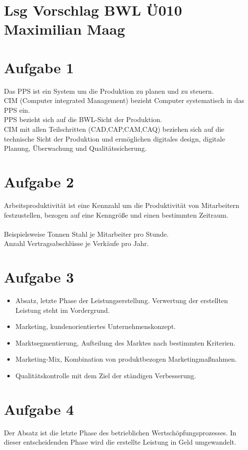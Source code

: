 \documentclass{article}
\begin{document}
	\section*{Lsg Vorschlag BWL Ü010 Maximilian Maag}
	\section*{Aufgabe 1}
	Das PPS ist ein System um die Produktion zu planen und zu steuern. \\
	CIM (Computer integrated Management) bezieht Computer systematisch in das PPS ein. \\
	PPS bezieht sich auf die BWL-Sicht der Produktion. \\
	CIM mit allen Teilschritten (CAD,CAP,CAM,CAQ) beziehen sich auf die technische Sicht der Produktion und ermöglichen digitales design, digitale Planung, Überwachung und Qualitätssicherung.
	\section*{Aufgabe 2}
	Arbeitsproduktivität ist eine Kennzahl um die Produktivität von Mitarbeitern festzustellen, bezogen auf eine Kenngröße und einen bestimmten Zeitraum. \\ \\
	Beispielsweise Tonnen Stahl je Mitarbeiter pro Stunde. \\
	Anzahl Vertragsabschlüsse je Verkäufe pro Jahr.
	\section*{Aufgabe 3}
	\begin{itemize}
		\item Absatz, letzte Phase der Leistungserstellung. Verwertung der erstellten Leistung steht im Vordergrund.
		\item Marketing, kundenorientiertes Unternehmenskonzept. 
		\item Marktsegmentierung, Aufteilung des Marktes nach bestimmten Kriterien.
		\item Marketing-Mix, Kombination von produktbezogen Marketingmaßnahmen.
		\item Qualitätskontrolle mit dem Ziel der ständigen Verbesserung.
	\end{itemize}
	\section*{Aufgabe 4}
	Der Absatz ist die letzte Phase des betrieblichen Wertschöpfungsprozesses. In dieser entscheidenden Phase wird die erstellte Leistung in Geld umgewandelt.
\end{document}
